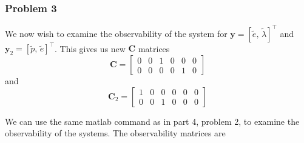 \subsubsection{Problem 3} \label{sec:P4p3}

We now wish to examine the observability of the system for $\bm{y} = [\tilde{e}, \, \tilde{\lambda}]^\top$ and  $\bm{y}_2 = [\tilde{p}, \, \tilde{e}]^\top$. This gives us new $\bm{C}$ matrices 
\begin{equation} \label{eq:part4_prob3_C}
    \bm{C} = 
	\begin{bmatrix}
		0   & 0   & 1   & 0   & 0   & 0 \\
		0   & 0   & 0   & 0   & 1   & 0
	\end{bmatrix}
\end{equation} 
and
\begin{equation} \label{eq:part4_prob3_C2}
    \bm{C}_2 = 
	\begin{bmatrix}
		1   & 0   & 0   & 0   & 0   & 0 \\
		0   & 0   & 1   & 0   & 0   & 0
	\end{bmatrix}
\end{equation} 

We can use the same matlab command as in part 4, problem 2, to examine the observability of the systems. The observability matrices are

